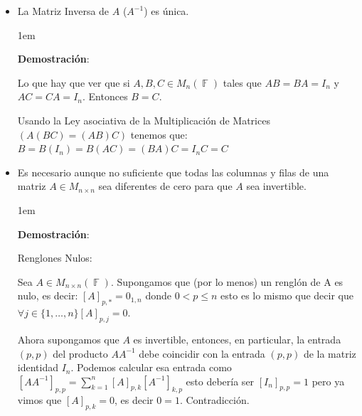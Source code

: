 \documentclass[12pt, fleqn]{report}                             %
\newenvironment{SmallIndentation}[1][0.75em]                    %
        {\begin{adjustwidth}{#1}{}\begin{footnotesize}}             %
        {\end{footnotesize}\end{adjustwidth}}                       %
\theoremstyle{break}                                            %
\DeclareMathOperator \GenericField {\mathbb{F}}                 %
\begin{document}
                \begin{itemize}

                    \item La Matriz Inversa de $A$ ($A^{-1}$) es única.

                        \begin{SmallIndentation}[1em]
                            \textbf{Demostración}:

                            Lo que hay que ver que si $A,B,C \in M_n(\GenericField)$ tales que
                            $AB = BA = I_n$ y $AC = CA = I_n$. Entonces $B=C$.

                            Usando la Ley asociativa de la Multiplicación de Matrices $(A(BC)=(AB)C)$
                            tenemos que:
                            $B = B(I_n) = B(AC) = (BA)C = I_nC =  C $

                        \end{SmallIndentation}

                    \item Es necesario aunque no suficiente que todas las columnas y filas de una
                        matriz $A \in M_{n \times n}$ sea diferentes de cero para que $A$ sea invertible.

                        \begin{SmallIndentation}[1em]
                            \textbf{Demostración}:

                            Renglones Nulos:

                                Sea $A \in M_{n \times n}(\GenericField)$.
                                Supongamos que (por lo menos) un renglón de A es nulo, es decir:
                                $[A]_{p,*} = 0_{1,n}$ donde $0 < p \leq n$ esto es lo mismo que decir
                                que $\forall j \in \{1, \dots, n\} [A]_{p,j} = 0$.

                                Ahora supongamos que $A$ es invertible, entonces, en particular, la entrada
                                $(p,p)$ del producto $AA^{-1}$ debe coincidir con la entrada $(p,p)$ de la
                                matriz identidad $I_n$.
                                Podemos calcular esa entrada como
                                $[AA^{-1}]_{p,p} = \sum_{k=1}^{n} [A]_{p,k} [A^{-1}]_{k,p}$
                                esto debería ser $[I_n]_{p,p}=1$ pero ya vimos que $[A]_{p,k} = 0$, es decir
                                $0 = 1$. Contradicción.



\end{SmallIndentation}
\end{itemize}
\end{document}
